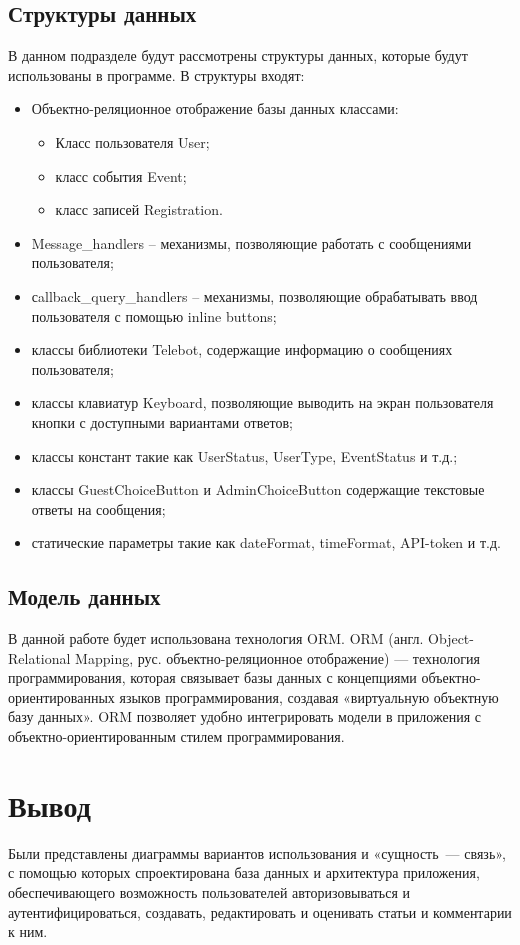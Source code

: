\documentclass[12pt,a4paper,oneside]{report}
\begin{document}
\subsection{Структуры данных}
В данном подразделе будут рассмотрены структуры данных, которые будут использованы в программе. В структуры входят:
\begin{itemize}
    \item Объектно-реляционное отображение базы данных классами:
    \begin{itemize}
        \item Класс пользователя User;
        \item класс события Event;
        \item класс записей Registration.
    \end{itemize}
    \item Message\_handlers – механизмы, позволяющие работать с сообщениями пользователя;
    \item сallback\_query\_handlers – механизмы, позволяющие обрабатывать ввод пользователя с помощью inline buttons;
    \item классы библиотеки Telebot, содержащие информацию о сообщениях пользователя;
    \item классы клавиатур Keyboard, позволяющие выводить на экран пользователя кнопки с доступными вариантами ответов;
    \item классы констант такие как UserStatus, UserType, EventStatus и т.д.;
    \item классы GuestChoiceButton и AdminChoiceButton содержащие текстовые ответы на сообщения;
    \item статические параметры такие как dateFormat, timeFormat, API-token и т.д.
\end{itemize}

\subsection{Модель данных}
В данной работе будет использована технология ORM. ORM (англ. Object-Relational Mapping, рус. объектно-реляционное отображение) — технология программирования, которая связывает базы данных с концепциями объектно-ориентированных языков программирования, создавая «виртуальную объектную базу данных». ORM позволяет удобно интегрировать модели в приложения с объектно-ориентированным стилем программирования.

\section*{Вывод}
\quad Были представлены диаграммы вариантов использования и «сущность~— связь», с помощью которых спроектирована база данных и архитектура приложения, обеспечивающего возможность пользователей авторизовываться и аутентифицироваться, создавать, редактировать и оценивать статьи и комментарии к ним.
\end{document}
